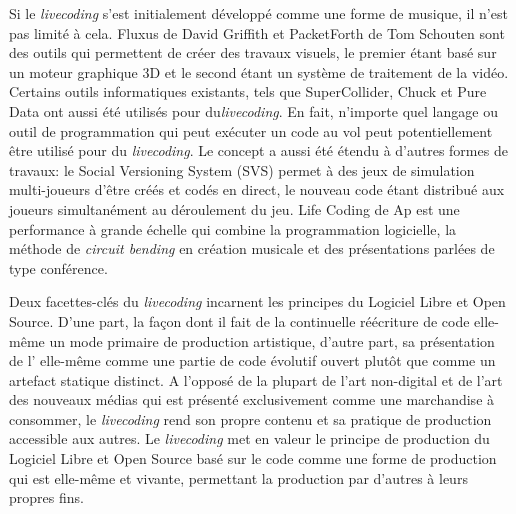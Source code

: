 {Si le {\em livecoding} s'est initialement d\'evelopp\'e comme une
forme de musique, il n'est pas limit\'e \`a cela. Fluxus de David
Griffith et PacketForth{\em } de{\em } Tom Schouten sont des
outils qui permettent de cr\'eer des travaux visuels, le premier
\'etant bas\'e sur un moteur graphique 3D et le second \'etant un
syst\`eme de traitement de la vid\'eo. Certains outils informatiques
existants, tels que SuperCollider,{\em } Chuck et Pure Data ont
aussi \'et\'e utilis\'es pour du{\em  livecoding}. En fait,
n'importe quel langage ou outil de programmation qui peut ex\'ecuter un
code au vol peut potentiellement \^etre utilis\'e pour du
{\em livecoding}. Le concept a aussi \'et\'e \'etendu \`a d'autres
formes de travaux: le Social Versioning System (SVS) permet \`a des
jeux de simulation multi{}-joueurs d'\^etre cr\'e\'es et cod\'es en
direct, le nouveau code \'etant distribu\'e aux joueurs simultan\'ement
au d\'eroulement du jeu. Life Coding de Ap est une performance \`a
grande \'echelle qui combine la programmation logicielle, la m\'ethode
de {\em circuit bending} en cr\'eation musicale et des
pr\'esentations parl\'ees de type conf\'erence.


Deux facettes{}-cl\'es du {\em livecoding} incarnent les principes du
Logiciel Libre et Open Source. D'une part, la fa\c{c}on dont il fait de
la continuelle r\'e\'ecriture de code elle{}-m\^eme un mode primaire de
production artistique, d'autre part, sa pr\'esentation de
l' elle{}-m\^eme comme une partie de code \'evolutif ouvert
plut\^ot que comme un artefact statique distinct. A l'oppos\'e de la
plupart de l'art non{}-digital et de l'art des nouveaux m\'edias qui
est pr\'esent\'e exclusivement comme une marchandise \`a consommer, le
{\em livecoding} rend son propre contenu et sa pratique de
production accessible aux autres. Le {\em livecoding} met en valeur
le principe de production du Logiciel Libre et Open Source bas\'e sur
le code comme une forme de production qui est elle{}-m\^eme  et
vivante, permettant la production par d'autres \`a leurs propres fins.


}
